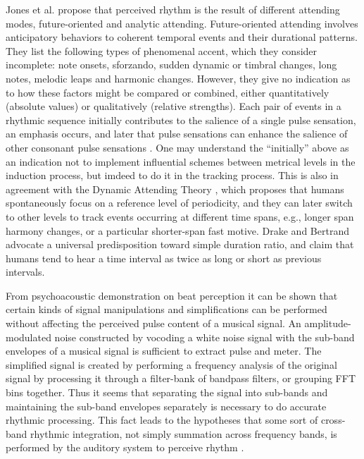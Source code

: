 \documentclass{scrartcl}
\begin{document}
Jones et al. \cite{Jones1989} propose that perceived rhythm is the result of different attending modes, future-oriented and analytic attending. Future-oriented attending involves anticipatory behaviors to coherent temporal events and their durational patterns. They list the following types of phenomenal accent, which they consider incomplete: note onsets, sforzando, sudden dynamic or timbral changes, long notes, melodic leaps and harmonic changes. However, they give no indication as to how these factors might be compared or combined, either quantitatively (absolute values) or qualitatively (relative strengths). Each pair of events in a rhythmic sequence initially contributes to the salience of a single pulse sensation, an emphasis occurs, and later that pulse sensations can enhance the salience of other consonant pulse sensations \cite{Parncutt1994}. One may understand the ``initially'' above as an indication not to implement influential schemes between metrical levels in the induction process, but imdeed to do it in the tracking process. This is also in agreement with the Dynamic Attending Theory \cite{Jones1989}, which proposes that humans spontaneously focus on a reference level of periodicity, and they can later switch to other levels to track events occurring at different time spans, e.g., longer span harmony changes, or a particular shorter-span fast motive. Drake and Bertrand \cite{Drake2001} advocate a universal predisposition toward simple duration ratio, and claim that humans tend to hear a time interval as twice as long or short as previous intervals. 

From psychoacoustic demonstration on beat perception it can be shown that certain kinds of signal manipulations and simplifications can be performed without affecting the perceived pulse content of a musical signal. An amplitude-modulated noise constructed by vocoding a white noise signal with the sub-band envelopes of a musical signal is sufficient to extract pulse and meter. The simplified signal is created by performing a frequency analysis of the original signal by processing it through a filter-bank of bandpass filters, or grouping FFT bins together. Thus it seems that separating the signal into sub-bands and maintaining the sub-band envelopes separately is necessary to do accurate rhythmic processing. This fact leads to the hypotheses that some sort of cross-band rhythmic integration, not simply summation across frequency bands, is performed by the auditory system to perceive rhythm \cite{Scheirer1998}.
\end{document}
